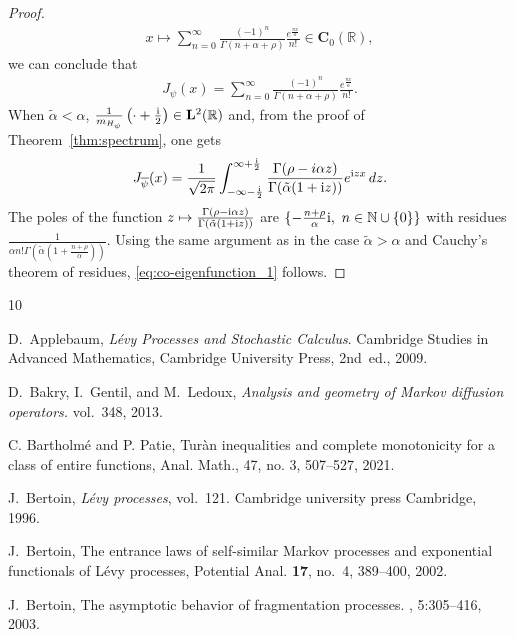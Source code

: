 \documentclass[12pt]{amsart}
\numberwithin{equation}{section}
\newcommand{\bb}{\mathbb}
\newcommand{\ov}{\overline}
\newcommand{\bmrm}[2][2]{\mathbf{#2}^{#1}}
\newcommand{\Jpo}{J_{\psi}}
\newcommand{\Hpsi}{H_\psi}
\newcommand{\C}{\mathbf{C}}
\renewcommand{\i}{\mathrm{i}}
\theoremstyle{definition}
\theoremstyle{assump}
\theoremstyle{remark}
\begin{document}
{\begin{proof}
\begin{align*}
x\mapsto \sum_{n=0}^\infty \frac{(-1)^n}{\Gamma(n+\alpha+\rho)}\frac{e^{\frac{nx}{\alpha}}}{n!} \in \C_0(\bb{R}),
\end{align*}
we can conclude that
\begin{align*}
\Jpo(x)=\sum_{n=0}^\infty \frac{(-1)^n}{\Gamma(n+\alpha+\rho)}\frac{e^{\frac{nx}{\alpha}}}{n!}.
\end{align*}
When $\tilde{\alpha}<\alpha$, $\frac{1}{m_{\Hpsi}}\left(\cdot+\frac{{\rm{i}}}{2}   \right)\in\bmrm{L}(\bb{R})$ and, from the proof of Theorem~\ref{thm:spectrum}, one gets
\begin{align*}
J_{\ov{\psi}}(x)=\frac{1}{\sqrt{2\pi}}\int_{-\infty-\frac{\i}{2}}^{\infty+\frac{{\rm{i}}}{2}   }\frac{\Gamma(\rho-i\alpha z)}{\Gamma(\tilde{\alpha}(1+{\rm{i}}z)   )}e^{{\rm{i}}zx}\,dz.
\end{align*}
The poles of the function $z\mapsto\frac{\Gamma(\rho-{\rm{i}}\alpha z)}{\Gamma(\tilde{\alpha}(1+{\rm{i}}z)   )}$ are $\{-\frac{n+\rho}{\alpha}{\rm{i}}, \ n\in\bb{N}\cup\{0\}\}$ with residues $\frac{1}{\alpha n!\Gamma(\tilde{\alpha}(1+\frac{n+\rho}{\alpha}))}$. Using the same argument as in the case $\tilde{\alpha}>\alpha$ and Cauchy's theorem of residues, \eqref{eq:co-eigenfunction_1} follows.
\end{proof}


\begin{thebibliography}{10}
	
D.~Applebaum, {\em Lévy Processes and Stochastic Calculus}.
\newblock Cambridge Studies in Advanced Mathematics, Cambridge University
Press, 2nd~ed., 2009.

D.~Bakry, I.~Gentil, and M.~Ledoux, {\em Analysis and geometry of Markov diffusion
  operators.} vol.~348, 2013.

C. Bartholm\'e  and P. Patie, Tur\`an inequalities and complete monotonicity for a class of entire
functions, {Anal. Math.}, 47, no. 3, 507–527, 2021.

J.~Bertoin, {\em L{\'e}vy processes}, vol.~121.
\newblock Cambridge university press Cambridge, 1996.

J.~Bertoin, {The entrance laws of self-similar {M}arkov processes and
  exponential functionals of {L}\'evy processes}, Potential Anal. \textbf{17}, no.~4, 389--400, 2002.

J.~Bertoin,
\newblock The asymptotic behavior of fragmentation processes.
, 5:305--416, 2003.



\end{thebibliography}}
\end{document}
